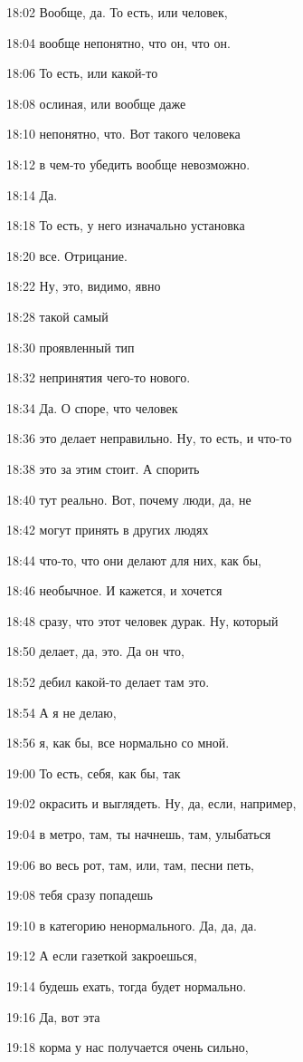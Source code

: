 18:02
Вообще, да. То есть, или человек,

18:04
вообще непонятно, что он, что он.

18:06
То есть, или какой-то

18:08
ослиная, или вообще даже

18:10
непонятно, что. Вот такого человека

18:12
в чем-то убедить вообще невозможно.

18:14
Да.

18:18
То есть, у него изначально установка

18:20
все. Отрицание.

18:22
Ну, это, видимо, явно

18:28
такой самый

18:30
проявленный тип

18:32
непринятия чего-то нового.

18:34
Да. О споре, что человек

18:36
это делает неправильно. Ну, то есть, и что-то

18:38
это за этим стоит. А спорить

18:40
тут реально. Вот, почему люди, да, не

18:42
могут принять в других людях

18:44
что-то, что они делают для них, как бы,

18:46
необычное. И кажется, и хочется

18:48
сразу, что этот человек дурак. Ну, который

18:50
делает, да, это. Да он что,

18:52
дебил какой-то делает там это.

18:54
А я не делаю,

18:56
я, как бы, все нормально со мной.

19:00
То есть, себя, как бы, так

19:02
окрасить и выглядеть. Ну, да, если, например,

19:04
в метро, там, ты начнешь, там, улыбаться

19:06
во весь рот, там, или, там, песни петь,

19:08
тебя сразу попадешь

19:10
в категорию ненормального. Да, да, да.

19:12
А если газеткой закроешься,

19:14
будешь ехать, тогда будет нормально.

19:16
Да, вот эта

19:18
корма у нас получается очень сильно,

